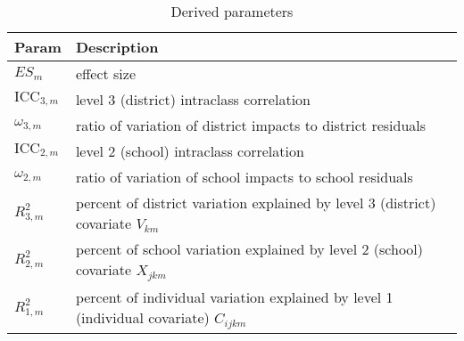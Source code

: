 \documentclass[12pt]{article}
\begin{document}
\begin{table}[p]
\begin{tabular}{l | l}
Param				& Description																				\\ \hline
$ES_{m}$				& effect size																				\\
$\text{ICC}_{3,m}$			& level 3 (district) intraclass correlation													\\
$\omega_{3,m}$		& ratio of variation of district impacts to district residuals								\\
$\text{ICC}_{2,m}$			& level 2 (school) intraclass correlation													\\
$\omega_{2,m}$		& ratio of variation of school impacts to school residuals									\\
$R_{3,m}^2$			& percent of district variation explained by level 3 (district) covariate	$V_{km}$			\\
$R_{2,m}^2$			& percent of school variation explained by level 2 (school) covariate	$X_{jkm}$			\\
$R_{1,m}^2$			& percent of individual variation explained by level 1 (individual covariate) $C_{ijkm}$		\\
\end{tabular}
\caption{Derived parameters\label{tab:derived_param}}
\end{table}
\end{document}

